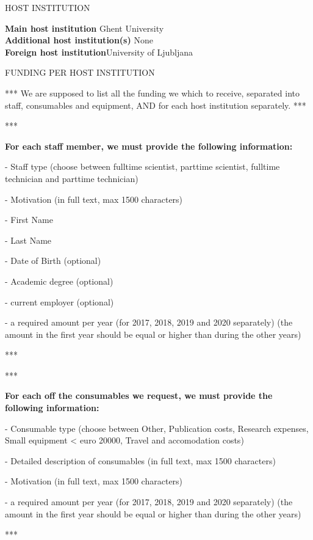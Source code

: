 \documentclass[11pt,dvipsnames,usenames,a4paper]{article}
\begin{document}
\vspace{10pt}

\begin{shaded}\centering HOST INSTITUTION \end{shaded}
\textbf{Main host institution} \tab Ghent University \\
\textbf{Additional host institution(s)} \tab None\\
\textbf{Foreign host institution}\tab University of Ljubljana \\

\begin{shaded}\centering FUNDING PER HOST INSTITUTION \end{shaded}

*** We are supposed to list all the funding we which to receive, separated into staff, consumables and equipment, AND for each host institution separately. ***

*** {\bf\color{blue}For each staff member, we must provide the following information:

- Staff type (choose between fulltime scientist, parttime scientist, fulltime technician and parttime technician)

- Motivation (in full text, max 1500 characters)

- First Name

- Last Name

- Date of Birth (optional)

- Academic degree (optional)

- current employer (optional)

- a required amount per year (for 2017, 2018, 2019 and 2020 separately) (the amount in the first year should be equal or higher than during the other years)

} ***

*** {\bf\color{blue}For each off the consumables we request, we must provide the following information:

- Consumable type (choose between Other, Publication costs, Research expenses, Small equipment < euro 20000, Travel and accomodation costs)

- Detailed description of consumables (in full text, max 1500 characters)

- Motivation (in full text, max 1500 characters)

- a required amount per year (for 2017, 2018, 2019 and 2020 separately) (the amount in the first year should be equal or higher than during the other years)

} ***
\end{document}
